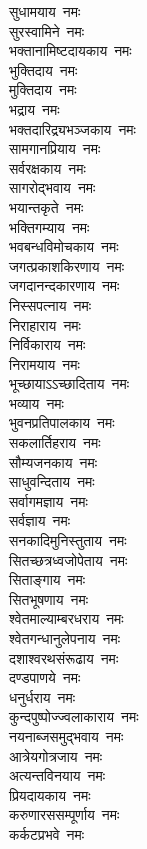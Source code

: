 \begin{flushleft}
\begin{multicols}{2}
सुधामयाय~नमः\\
सुरस्वामिने~नमः\\
भक्तानामिष्टदायकाय~नमः\\
भुक्तिदाय~नमः\\
मुक्तिदाय~नमः\\
भद्राय~नमः\\
भक्तदारिद्र्यभञ्जकाय~नमः\\
सामगानप्रियाय~नमः\\
सर्वरक्षकाय~नमः\hfill{}\\
सागरोद्भवाय~नमः\\
भयान्तकृते~नमः\\
भक्तिगम्याय~नमः\\
भवबन्धविमोचकाय~नमः\\
जगत्प्रकाशकिरणाय~नमः\\
जगदानन्दकारणाय~नमः\\
निस्सपत्नाय~नमः\\
निराहाराय~नमः\\
निर्विकाराय~नमः\\
निरामयाय~नमः\hfill{}\\
भूच्छायाऽऽच्छादिताय~नमः\\
भव्याय~नमः\\
भुवनप्रतिपालकाय~नमः\\
सकलार्तिहराय~नमः\\
सौम्यजनकाय~नमः\\
साधुवन्दिताय~नमः\\
सर्वागमज्ञाय~नमः\\
सर्वज्ञाय~नमः\\
सनकादिमुनिस्तुताय~नमः\\
सितच्छत्रध्वजोपेताय~नमः\hfill{}\\
सिताङ्गाय~नमः\\
सितभूषणाय~नमः\\
श्वेतमाल्याम्बरधराय~नमः\\
श्वेतगन्धानुलेपनाय~नमः\\
दशाश्वरथसंरूढाय~नमः\\
दण्डपाणये~नमः\\
धनुर्धराय~नमः\\
कुन्दपुष्पोज्ज्वलाकाराय~नमः\\
नयनाब्जसमुद्भवाय~नमः\\
आत्रेयगोत्रजाय~नमः\hfill{}\\
अत्यन्तविनयाय~नमः\\
प्रियदायकाय~नमः\\
करुणारससम्पूर्णाय~नमः\\
कर्कटप्रभवे~नमः\\

\end{multicols}
\end{flushleft}
